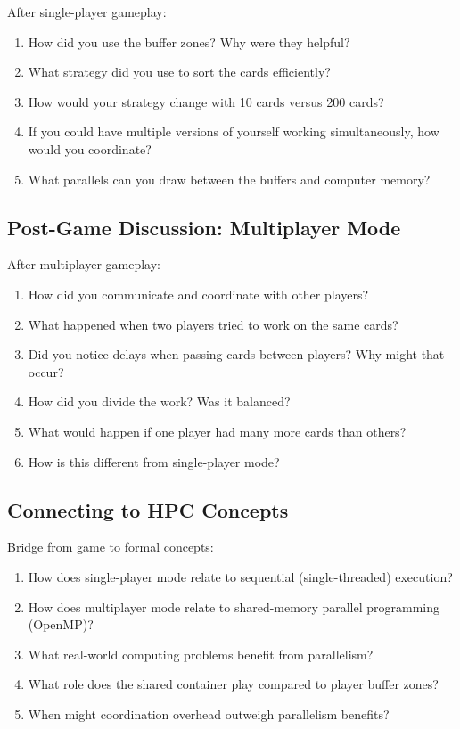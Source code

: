 After single-player gameplay:

\begin{enumerate}
    \item How did you use the buffer zones? Why were they helpful?
    \item What strategy did you use to sort the cards efficiently?
    \item How would your strategy change with 10 cards versus 200 cards?
    \item If you could have multiple versions of yourself working simultaneously, how would you coordinate?
    \item What parallels can you draw between the buffers and computer memory?
\end{enumerate}

\subsection{Post-Game Discussion: Multiplayer Mode}

After multiplayer gameplay:

\begin{enumerate}
    \item How did you communicate and coordinate with other players?
    \item What happened when two players tried to work on the same cards?
    \item Did you notice delays when passing cards between players? Why might that occur?
    \item How did you divide the work? Was it balanced?
    \item What would happen if one player had many more cards than others?
    \item How is this different from single-player mode?
\end{enumerate}

\subsection{Connecting to HPC Concepts}

Bridge from game to formal concepts:

\begin{enumerate}
    \item How does single-player mode relate to sequential (single-threaded) execution?
    \item How does multiplayer mode relate to shared-memory parallel programming (OpenMP)?
    \item What real-world computing problems benefit from parallelism?
    \item What role does the shared container play compared to player buffer zones?
    \item When might coordination overhead outweigh parallelism benefits?
\end{enumerate}

